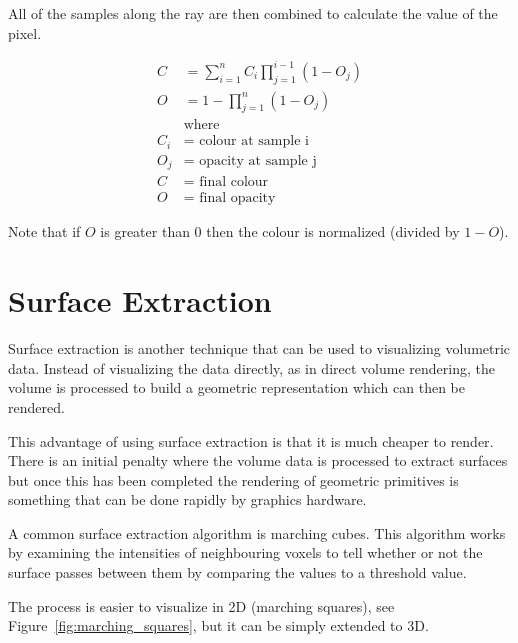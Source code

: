 All of the samples along the ray are then combined to calculate the value of the pixel.

\begin{align*}
	C &= \sum\limits_{i=1}^n C_{i}\prod\limits_{j=1}^{i-1}(1 - O_j) \\
	O &= 1 - \prod\limits_{j=1}^n(1 - O_j) \\
	& \text{where} \\
	C_i &= \text{ colour at sample i} \\
	O_j &= \text{ opacity at sample j} \\
	C &= \text{ final colour} \\
	O &= \text{ final opacity}
\end{align*}

Note that if $O$ is greater than 0 then the colour is normalized (divided by $1 - O$).

\newpage
\section{Surface Extraction}\label{background:surfaceextraction}
Surface extraction is another technique that can be used to visualizing volumetric data. Instead of visualizing the data directly, as in direct volume rendering, the volume is processed to build a geometric representation which can then be rendered.

This advantage of using surface extraction is that it is much cheaper to render\cite{surfacevsvolumerendering}. There is an initial penalty where the volume data is processed to extract surfaces but once this has been completed the rendering of geometric primitives is something that can be done rapidly by graphics hardware.

A common surface extraction algorithm is marching cubes. This algorithm works by examining the intensities of neighbouring voxels to tell whether or not the surface passes between them by comparing the values to a threshold value. 

The process is easier to visualize in 2D (marching squares), see Figure~\ref{fig:marching_squares}, but it can be simply extended to 3D.

